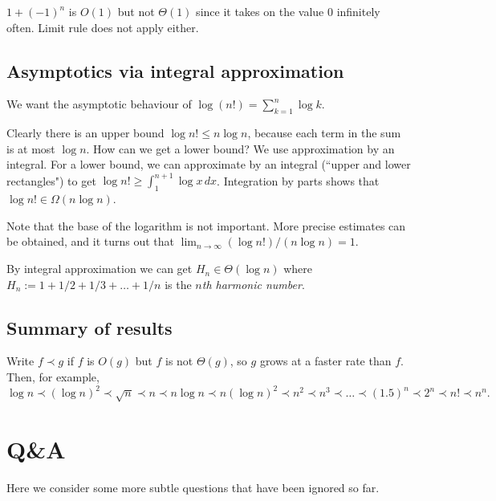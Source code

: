 \begin{Boxample}
$1 + (-1)^n$ is $O(1)$ but not $\Theta(1)$ since it takes on the value $0$
 infinitely often. Limit rule does not apply either.
\end{Boxample}
 
\section*{Asymptotics via integral approximation}
\begin{Boxample}[8]
We want the asymptotic behaviour of $\log (n!) = \sum_{k=1}^n \log k$.

Clearly there is an upper bound $\log n! \leq n \log n$, because each term in the sum is at most $\log n$. 
How can we get a lower bound? We use approximation by an integral.
For a lower bound, we can approximate by an integral (``upper and lower rectangles") to get 
$\log n! \geq \int_1^{n+1} \log x \, dx$. Integration by parts shows that 
$\log n! \in \Omega(n \log n)$.

\item Note that the base of the logarithm is not important. More precise estimates can 
be obtained, and it turns out that $\lim_{n\to \infty} (\log n!)/(n \log n) = 1$.
\fi
\end{Boxample}

\begin{Boxample} 
By integral approximation we can get $H_n \in \Theta(\log n)$ where 
$H_n:=1+ 1/2 + 1/3 + \dots + 1/n$ is the $n$\emph{th harmonic number}. 
\end{Boxample}

\section*{Summary of results}
Write $f \prec g$ if $f$ is $O(g)$ but $f$ is not $\Theta(g)$, so $g$ grows at a
 faster rate than $f$. Then, for example, 
$$
 \log n \prec (\log n)^2 \prec \sqrt{n} \prec n \prec n \log n 
 \prec n (\log n)^2 \prec n^2 
\prec n^3 \prec \dots \prec (1.5)^n \prec 2^n \prec n! \prec n^n.
$$




\chapter{Q\&A} %

Here we consider some more subtle questions that have been ignored so far.

